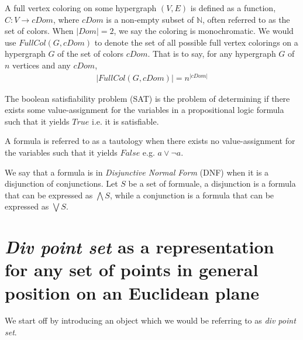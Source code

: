 \documentclass[11pt, oneside]{article}      %
\theoremstyle{definition}
\numberwithin{equation}{section}
\theoremstyle{c}
\begin{document}
A full vertex coloring on some hypergraph $(V,E)$ is defined as a function, $C : V \longrightarrow cDom$, where $cDom$ is a non-empty subset of $\mathbb{N}$, often referred to as the set of colors. When $|Dom|=2$, we say the coloring is monochromatic. We would use $FullCol(G,cDom)$ to denote the set of all possible full vertex colorings on a hypergraph $G$ of the set of colors $cDom$. That is to say, for any hypergraph $G$ of $n$ vertices and any $cDom$,
\begin{align*}
|FullCol(G,cDom)| = n^{|cDom|}
\end{align*}

The boolean satisfiability problem (SAT) is the problem of determining if there exists some value-assignment for the variables in a propositional logic formula such that it yields $True$ i.e. it is satisfiable.

A formula is referred to as a tautology when there exists no value-assignment for the variables such that it yields $False$ e.g. $a \lor \neg a$.

We say that a formula is in \textit{Disjunctive Normal Form} (DNF) when it is a disjunction of conjunctions. Let $S$ be a set of formuale, a disjunction is a formula that can be expressed as $\bigwedge S$, while a conjunction is a formula that can be expressed as $\bigvee S$.

\section{\textit{Div point set} as a representation for any set of points in general position on an Euclidean plane}

We start off by introducing an object which we would be referring to as \textit{div point set}.
\end{document}
